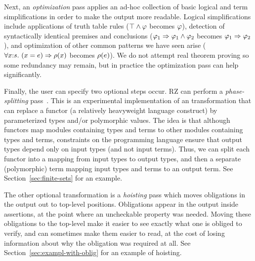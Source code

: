 \fi %
%
Next, an \emph{optimization} pass applies an ad-hoc collection of
basic logical and term simplifications in order to make the output more readable. 
\iflong
Logical simplifications include applications of truth table rules
($\top\land \varphi$ becomes $\varphi$), detection of syntactically
identical premises and conclusions
($\varphi_1\Rightarrow \varphi_1\land \varphi_2$ becomes
$\varphi_1\Rightarrow \varphi_2$), and optimization of other common patterns we have
seen arise
($\forall x{:}s.\ (x = e)\Rightarrow \rho(x)$ becomes
$\rho(e)$).
\fi %
We do not attempt real theorem proving 
so some redundancy may remain, but in practice the optimization pass
can help significantly.

Finally, the user can specify two optional steps occur.
RZ can perform a \emph{phase-splitting} pass~\cite{harper+:popl90}. 
This is an experimental implementation of an transformation that can replace a functor (a relatively heavyweight language construct) by
parameterized types and/or polymorphic values. 
\iflong
The idea is that although
functors map modules containing types and terms to other modules containing types
and terms, constraints on the programming language ensure that output types
depend only on input types (and not input terms).  Thus, we can split each
functor into a mapping from input types to output types, and then a separate
(polymorphic) term mapping input types and terms to an output term.
See Section~\ref{sec:finite-sets} for an example.
\fi


The other optional transformation is a \emph{hoisting} pass which
moves obligations in the output out to top-level positions.  Obligations
appear in the output inside assertions, at the point where an uncheckable property was needed.
Moving these obligations to the top-level 
make it easier to see exactly what one is obliged to verify, and can
sometimes make them easier to read, at the cost of losing information about
why the obligation was required at all. 
\iflong
See
Section~\ref{sec:exampl-with-oblig} for an example of hoisting.
\fi %

